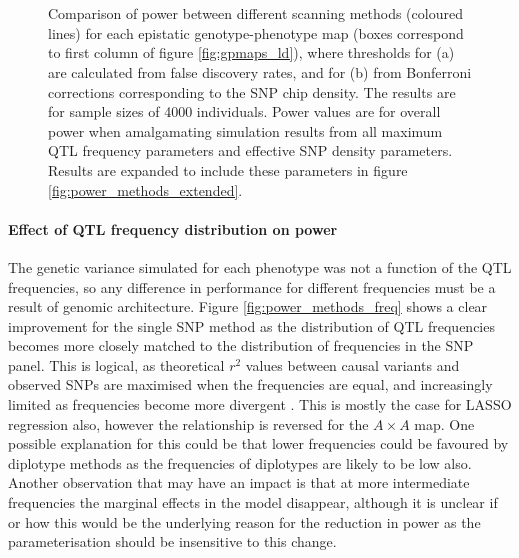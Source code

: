 \begin{figure}
\begin{center}
\begin{center}
 \\
 \\
\caption[Comparison of power between different scanning methods]{Comparison of power between different scanning methods (coloured lines) for each epistatic genotype-phenotype map (boxes correspond to first column of figure \ref{fig:gpmaps_ld}), where thresholds for (a) are calculated from false discovery rates, and for (b) from Bonferroni corrections corresponding to the SNP chip density. The results are for sample sizes of 4000 individuals. Power values are for overall power when amalgamating simulation results from all maximum QTL frequency parameters and effective SNP density parameters. Results are expanded to include these parameters in figure \ref{fig:power_methods_extended}.}
 \label{fig:power_methods}
\end{center}
\end{center}
\end{figure}


\paragraph{Effect of QTL frequency distribution on power}
The genetic variance simulated for each phenotype was not a function of the QTL frequencies, so any difference in performance for different frequencies must be a result of genomic architecture. Figure \ref{fig:power_methods_freq} shows a clear improvement for the single SNP method as the distribution of QTL frequencies becomes more closely matched to the distribution of frequencies in the SNP panel. This is logical, as theoretical $r^2$ values between causal variants and observed SNPs are maximised when the frequencies are equal, and increasingly limited as frequencies become more divergent \citep{Schork2000}. This is mostly the case for LASSO regression also, however the relationship is reversed for the $A \times A$ map. One possible explanation for this could be that lower frequencies could be favoured by diplotype methods as the frequencies of diplotypes are likely to be low also. Another observation that may have an impact is that at more intermediate frequencies the marginal effects in the model disappear, although it is unclear if or how this would be the underlying reason for the reduction in power as the parameterisation should be insensitive to this change.


